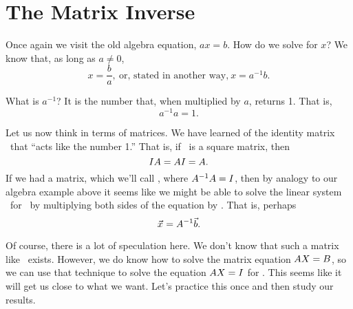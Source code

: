 \section{The Matrix Inverse}\label{sec:inverses}


Once again we visit the old algebra equation, $ax=b$. How do we solve for $x$? We know that, as long as $a\neq 0$, $$x = \frac{b}{a}, \ \text{or, stated in another way,} \ x = a^{-1}b.$$ 

What is $a^{-1}$? It is the number that, when multiplied by $a$, returns 1. That is, $$a^{-1}a = 1.$$

Let us now think in terms of matrices. We have learned of the identity matrix \tti\ that ``acts like the number 1.'' That is, if \tta\ is a square matrix, then $$IA = AI = A.$$
If we had a matrix, which we'll call \ttai, where $A^{-1}A=I$, then by analogy to our algebra example above it seems like we might be able to solve the linear system \ttaxb\ for \vx\ by multiplying both sides of the equation by \ttai. That is, perhaps $$\vec{x_{}} = A^{-1}\vec{b}.$$

Of course, there is a lot of speculation here. We don't know that such a matrix like \ttai\ exists. However, we do know how to solve the matrix equation $AX = B$, so we can use that technique to solve the equation $AX = I$ for \ttx. This seems like it will get us close to what we want. Let's practice this once and then study our results.\\

